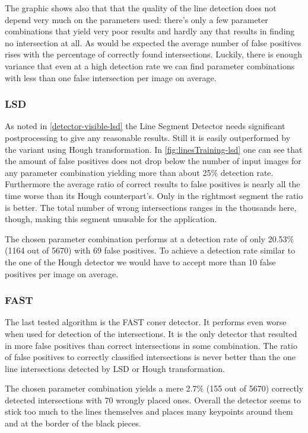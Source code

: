 	The graphic shows also that that the quality of the line detection does not depend very much on the parameters used: there's only a few parameter combinations that yield very poor results and hardly any that results in finding no intersection at all. As would be expected the average number of false positives rises with the percentage of correctly found intersections. Luckily, there is enough variance that even at a high detection rate we can find parameter combinations with less than one false intersection per image on average.

	\subsubsection{LSD}
	\label{evaluation-visible-optimization-lsd}
	As noted in \autoref{detector-visible-lsd} the Line Segment Detector needs significant postprocessing to give any reasonable results. Still it is easily outperformed by the variant using Hough transformation. In \autoref{fig:linesTraining-lsd} one can see that the amount of false positives does not drop below the number of input images for any parameter combination yielding more than about 25\% detection rate. Furthermore the average ratio of correct results to false positives is nearly all the time worse than its Hough counterpart's. Only in the rightmost segment the ratio is better. The total number of wrong intersections ranges in the thousands here, though, making this segment unusable for the application.

	The chosen parameter combination performs at a detection rate of only 20.53\% (1164 out of 5670) with 69 false positives. To achieve a detection rate similar to the one of the Hough detector we would have to accept more than 10 false positives per image on average.

	\subsubsection{FAST}
	\label{evaluation-visible-optimization-fast}
	The last tested algorithm is the FAST coner detector. It performs even worse when used for detection of the intersections. It is the only detector that resulted in more false positives than correct intersections in some combination. The ratio of false positives to correctly classified intersections is never better than the one line intersections detected by LSD or Hough transformation.

	The chosen parameter combination yields a mere 2.7\% (155 out of 5670) correctly detected intersections with 70 wrongly placed ones. Overall the detector seems to stick too much to the lines themselves and places many keypoints around them and at the border of the black pieces.

